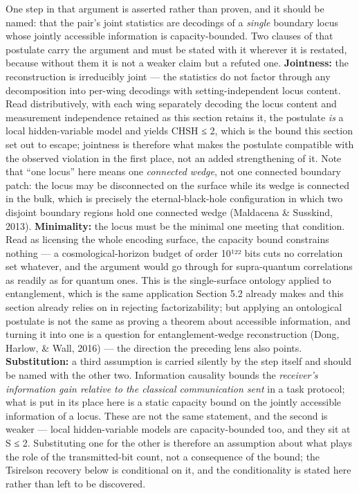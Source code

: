 \documentclass[
]{article}
\begin{document}
One step in that argument is asserted rather than proven, and it should
be named: that the pair's joint statistics are decodings of a
\emph{single} boundary locus whose jointly accessible information is
capacity-bounded. Two clauses of that postulate carry the argument and
must be stated with it wherever it is restated, because without them it
is not a weaker claim but a refuted one. \textbf{Jointness:} the
reconstruction is irreducibly joint --- the statistics do not factor
through any decomposition into per-wing decodings with
setting-independent locus content. Read distributively, with each wing
separately decoding the locus content and measurement independence
retained as this section retains it, the postulate \emph{is} a local
hidden-variable model and yields CHSH ≤ 2, which is the bound this
section set out to escape; jointness is therefore what makes the
postulate compatible with the observed violation in the first place, not
an added strengthening of it. Note that ``one locus'' here means one
\emph{connected wedge}, not one connected boundary patch: the locus may
be disconnected on the surface while its wedge is connected in the bulk,
which is precisely the eternal-black-hole configuration in which two
disjoint boundary regions hold one connected wedge (Maldacena \&
Susskind, 2013). \textbf{Minimality:} the locus must be the minimal one
meeting that condition. Read as licensing the whole encoding surface,
the capacity bound constrains nothing --- a cosmological-horizon budget
of order 10¹²² bits cuts no correlation set whatever, and the argument
would go through for supra-quantum correlations as readily as for
quantum ones. This is the single-surface ontology applied to
entanglement, which is the same application Section 5.2 already makes
and this section already relies on in rejecting factorizability; but
applying an ontological postulate is not the same as proving a theorem
about accessible information, and turning it into one is a question for
entanglement-wedge reconstruction (Dong, Harlow, \& Wall, 2016) --- the
direction the preceding lens also points. \textbf{Substitution:} a third
assumption is carried silently by the step itself and should be named
with the other two. Information causality bounds the \emph{receiver's
information gain relative to the classical communication sent} in a task
protocol; what is put in its place here is a static capacity bound on
the jointly accessible information of a locus. These are not the same
statement, and the second is weaker --- local hidden-variable models are
capacity-bounded too, and they sit at S ≤ 2. Substituting one for the
other is therefore an assumption about what plays the role of the
transmitted-bit count, not a consequence of the bound; the Tsirelson
recovery below is conditional on it, and the conditionality is stated
here rather than left to be discovered.
\end{document}
